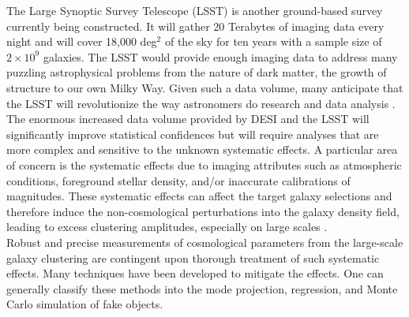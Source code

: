 The Large Synoptic Survey Telescope (LSST) is another ground-based survey currently being constructed. It will gather 20 Terabytes of imaging data every night and will cover 18,000 deg$^{2}$ of the sky for ten years with a sample size of $2\times 10^{9}$ galaxies. The LSST would provide enough imaging data to address many puzzling astrophysical problems from the nature of dark matter, the growth of structure to our own Milky Way. Given such a data volume, many anticipate that the LSST will revolutionize the way astronomers do research and data analysis \citep{ivezic2008lsst, LSSTObservingStrategyWhitePaper}. \\

The enormous increased data volume provided by DESI and the LSST will significantly improve statistical confidences but will require analyses that are more complex and sensitive to the unknown systematic effects. A particular area of concern is the systematic effects due to imaging attributes such as atmospheric conditions, foreground stellar density, and/or inaccurate calibrations of magnitudes. These systematic effects can affect the target galaxy selections and therefore induce the non-cosmological perturbations into the galaxy density field, leading to excess clustering amplitudes, especially on large scales \citep[see e.g.][]{myers2007clustering,thomas2011angular,thomas2011excess, ross2011ameliorating, ashley2012MNRAS, 2012ApJ...761...14H, huterer2013calibration, pullen2013systematic}.\\ 


Robust and precise measurements of cosmological parameters from the large-scale galaxy clustering are contingent upon thorough treatment of such systematic effects. Many techniques have been developed to mitigate the effects. One can generally classify these methods into the mode projection, regression,  and Monte Carlo simulation of fake objects.\\ 

